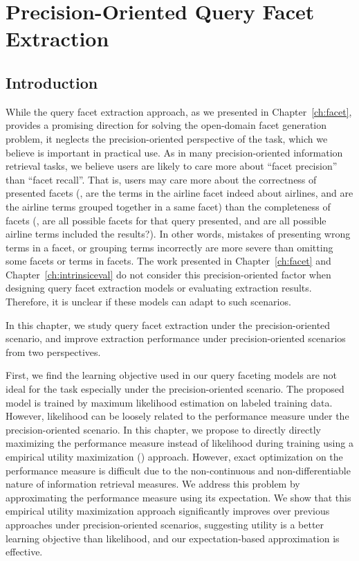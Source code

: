 \chapter{Precision-Oriented Query Facet Extraction}
\label{ch:precision}
\section{Introduction}
\label{sec:precision-intro}
While the query facet extraction approach, as we presented in Chapter~\ref{ch:facet}, provides a promising direction for solving the open-domain facet generation problem, it neglects the precision-oriented perspective of the task, which we believe is important in practical use. As in many precision-oriented information retrieval tasks, we believe users are likely to care more about ``facet precision'' than ``facet recall''. That is, users may care more about the correctness of presented facets (\eg, are the terms in the airline facet indeed about airlines, and are the airline terms grouped together in a same facet) than the completeness of facets (\eg, are all possible facets for that query presented, and are all possible airline terms included the results?). In other words, mistakes of presenting wrong terms in a facet, or grouping terms incorrectly are more severe than omitting some facets or terms in facets. The work presented in Chapter~\ref{ch:facet} and Chapter~\ref{ch:intrinsiceval} do not consider 
this precision-oriented factor when designing query facet extraction models or evaluating 
extraction results. Therefore, it is unclear if these models can adapt to such scenarios.

In this chapter, we study query facet extraction under the precision-oriented scenario, and improve extraction performance under precision-oriented scenarios from two perspectives.

First, we find the learning objective used in our query faceting models are not ideal for the task especially under the precision-oriented scenario. The proposed model is trained by maximum likelihood estimation on labeled training data. However, likelihood can be loosely related to the performance measure under the precision-oriented scenario. In this chapter, we propose to directly directly maximizing the performance measure \PRF instead of likelihood during training using a empirical utility maximization (\EUM) approach. However, exact optimization on the performance measure is difficult due to the non-continuous and non-differentiable nature of information retrieval measures. We address this problem by approximating the performance measure using its expectation. We show that this empirical utility maximization approach significantly improves over previous approaches under precision-oriented scenarios, suggesting utility is a better learning objective than likelihood, and our expectation-based 
approximation is effective.  

